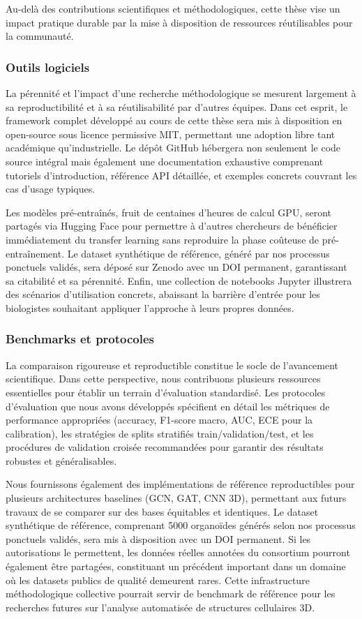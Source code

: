 Au-delà des contributions scientifiques et méthodologiques, cette thèse vise un impact pratique durable par la mise à disposition de ressources réutilisables pour la communauté.

\subsubsection{Outils logiciels}

La pérennité et l'impact d'une recherche méthodologique se mesurent largement à sa reproductibilité et à sa réutilisabilité par d'autres équipes. Dans cet esprit, le framework complet développé au cours de cette thèse sera mis à disposition en open-source sous licence permissive MIT, permettant une adoption libre tant académique qu'industrielle. Le dépôt GitHub hébergera non seulement le code source intégral mais également une documentation exhaustive comprenant tutoriels d'introduction, référence API détaillée, et exemples concrets couvrant les cas d'usage typiques. 

Les modèles pré-entraînés, fruit de centaines d'heures de calcul GPU, seront partagés via Hugging Face pour permettre à d'autres chercheurs de bénéficier immédiatement du transfer learning sans reproduire la phase coûteuse de pré-entraînement. Le dataset synthétique de référence, généré par nos processus ponctuels validés, sera déposé sur Zenodo avec un DOI permanent, garantissant sa citabilité et sa pérennité. Enfin, une collection de notebooks Jupyter illustrera des scénarios d'utilisation concrets, abaissant la barrière d'entrée pour les biologistes souhaitant appliquer l'approche à leurs propres données.

\subsubsection{Benchmarks et protocoles}

La comparaison rigoureuse et reproductible constitue le socle de l'avancement scientifique. Dans cette perspective, nous contribuons plusieurs ressources essentielles pour établir un terrain d'évaluation standardisé. Les protocoles d'évaluation que nous avons développés spécifient en détail les métriques de performance appropriées (accuracy, F1-score macro, AUC, ECE pour la calibration), les stratégies de splits stratifiés train/validation/test, et les procédures de validation croisée recommandées pour garantir des résultats robustes et généralisables.

Nous fournissons également des implémentations de référence reproductibles pour plusieurs architectures baselines (GCN, GAT, CNN 3D), permettant aux futurs travaux de se comparer sur des bases équitables et identiques. Le dataset synthétique de référence, comprenant 5000 organoïdes générés selon nos processus ponctuels validés, sera mis à disposition avec un DOI permanent. Si les autorisations le permettent, les données réelles annotées du consortium pourront également être partagées, constituant un précédent important dans un domaine où les datasets publics de qualité demeurent rares. Cette infrastructure méthodologique collective pourrait servir de benchmark de référence pour les recherches futures sur l'analyse automatisée de structures cellulaires 3D.

